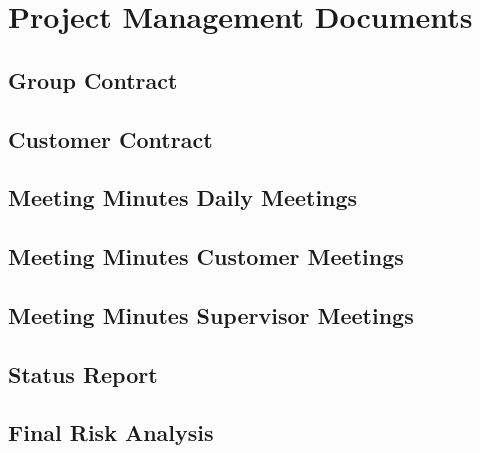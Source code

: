 \chapter{Project Management Documents}

\section{Group Contract}
\label{group_contract}

\section{Customer Contract}
\label{customer_contract}

\section{Meeting Minutes Daily Meetings}
\label{meeting_minutes_daily_meetings}

\section{Meeting Minutes Customer Meetings}
\label{meeting_minutes_customer_meetings}

\section{Meeting Minutes Supervisor Meetings}
\label{meeting_minutes_supervisor_meetings}

\section{Status Report}
\label{status_report}

\section{Final Risk Analysis}
\label{final_risk_analysis}

\cleardoublepage